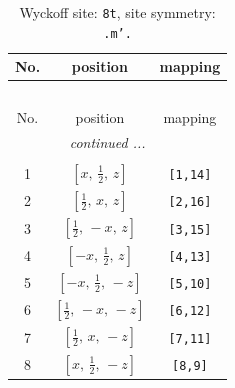 \documentclass[fleqn,8pt]{jsarticle}
\begin{document}
\renewcommand{\arraystretch}{1.2}
\begin{longtable}{ccc}
\caption{Wyckoff site: {\tt 8t}, site symmetry: {\tt .m'.}}
 \\
 \hline \hline
No. & position & mapping \\ \hline \endfirsthead

\multicolumn{2}{l}{\tablename\ \thetable{}} \\
 \hline \hline
No. & position & mapping \\ \hline \endhead

 \hline \hline
\multicolumn{2}{r}{\footnotesize\it continued ...} \\ \endfoot

 \hline \hline
\multicolumn{2}{r}{} \\ \endlastfoot

1 & $\left[ x,\, \frac{1}{2},\, z \right]$ & {\tt [1,14]} \\ \hline
2 & $\left[ \frac{1}{2},\, x,\, z \right]$ & {\tt [2,16]} \\ \hline
3 & $\left[ \frac{1}{2},\, - x,\, z \right]$ & {\tt [3,15]} \\ \hline
4 & $\left[ - x,\, \frac{1}{2},\, z \right]$ & {\tt [4,13]} \\ \hline
5 & $\left[ - x,\, \frac{1}{2},\, - z \right]$ & {\tt [5,10]} \\ \hline
6 & $\left[ \frac{1}{2},\, - x,\, - z \right]$ & {\tt [6,12]} \\ \hline
7 & $\left[ \frac{1}{2},\, x,\, - z \right]$ & {\tt [7,11]} \\ \hline
8 & $\left[ x,\, \frac{1}{2},\, - z \right]$ & {\tt [8,9]} \\
\end{longtable}
\renewcommand{\arraystretch}{1.2}
\end{document}
